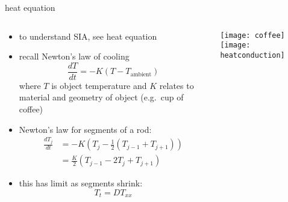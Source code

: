 \begin{frame}{heat equation}
\label{slide:heatcompare}

\small
\begin{columns}
\begin{column}{0.6\textwidth}
\begin{itemize}
\item to understand SIA, see heat equation
\item recall Newton's law of cooling
	$$\frac{dT}{dt} = -K (T-T_{\text{ambient}})$$
where $T$ is object temperature and $K$ relates to material and geometry of object (e.g.~cup of coffee)
\item Newton's law for segments of a rod:
\begin{align*}
\frac{dT_j}{dt} &= -K \left(T_j - \frac{1}{2} (T_{j-1} + T_{j+1}) \right) \\
	&= \frac{K}{2} \left(T_{j-1} - 2 T_j + T_{j+1}\right) 
\end{align*}
\item this has limit as segments shrink:
	$$T_t = D T_{xx}$$
\end{itemize}
\end{column}

\begin{column}{0.4\textwidth}
\hfill
\texttt{[image: coffee]}
\vspace{1.0in}
\texttt{[image: heatconduction]}
\end{column}
\end{columns}
\end{frame}

